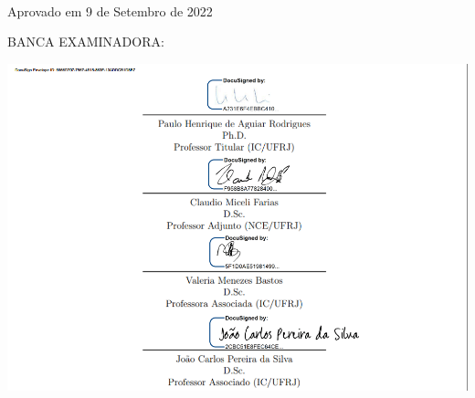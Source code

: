 \begin{folhadeaprovacao}
\vspace*{\fill}
\begin{center}
    {\MakeUppercase{\imprimirautor}} 
    \vspace*{\fill}
    \begin{center}
      \imprimirtitulo \\
    \end{center}
    \vspace*{\fill}
  \end{center}
  \hspace*{\fill}\parbox[b]{.5\textwidth}{%
    \linespread{1}\selectfont
    \imprimirpreambulo
}

\vspace*{\fill}
    \begin{flushleft}
   Aprovado em 9 de Setembro de 2022
  \par
  \vspace*{\fill}
 
 
BANCA EXAMINADORA:
\end{flushleft}

\hspace*{-2.8cm}\includegraphics[]{figuras/folha_aprovacao.png}




\end{folhadeaprovacao}
